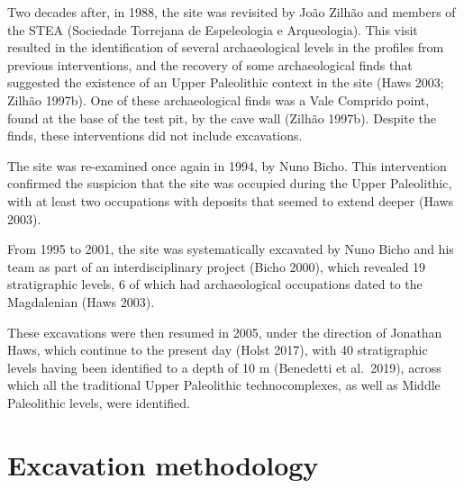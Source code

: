 \documentclass[12pt,twoside]{reedthesis}
\begin{document}
Two decades after, in 1988, the site was revisited by João Zilhão and members of the STEA (Sociedade Torrejana de Espeleologia e Arqueologia). This visit resulted in the identification of several archaeological levels in the profiles from previous interventions, and the recovery of some archaeological finds that suggested the existence of an Upper Paleolithic context in the site (Haws 2003; Zilhão 1997b). One of these archaeological finds was a Vale Comprido point, found at the base of the test pit, by the cave wall (Zilhão 1997b). Despite the finds, these interventions did not include excavations.

The site was re-examined once again in 1994, by Nuno Bicho. This intervention confirmed the suspicion that the site was occupied during the Upper Paleolithic, with at least two occupations with deposits that seemed to extend deeper (Haws 2003).

From 1995 to 2001, the site was systematically excavated by Nuno Bicho and his team as part of an interdisciplinary project (Bicho 2000), which revealed 19 stratigraphic levels, 6 of which had archaeological occupations dated to the Magdalenian (Haws 2003).

These excavations were then resumed in 2005, under the direction of Jonathan Haws, which continue to the present day (Holst 2017), with 40 stratigraphic levels having been identified to a depth of 10 m (Benedetti et al.~2019), across which all the traditional Upper Paleolithic technocomplexes, as well as Middle Paleolithic levels, were identified.

\hypertarget{excavation-methodology-1}{%
\section{Excavation methodology}\label{excavation-methodology-1}}
\end{document}

